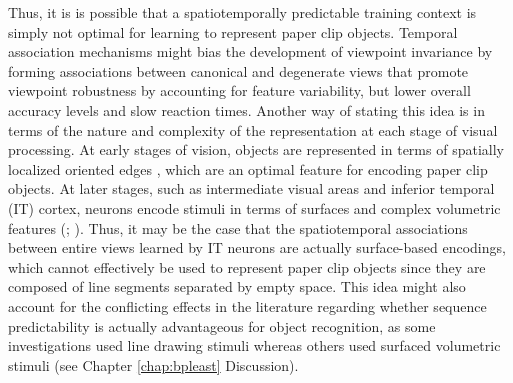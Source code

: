 \documentclass[dwyatte_dissertation.tex]{subfiles}
\begin{document}
Thus, it is is possible that a spatiotemporally predictable training context is simply not optimal for learning to represent paper clip objects. Temporal association mechanisms \cite{StringerPerryRollsEtAl06,WallisBaddeley97,IsikLeiboPoggio12,WallisBulthoff01,WallisBackusLangerEtAl09} might bias the development of viewpoint invariance by forming  associations between canonical and degenerate views that promote viewpoint robustness by accounting for feature variability, but lower overall accuracy levels and slow reaction times. Another way of stating this idea is in terms of the nature and complexity of the representation at each stage of visual processing. At early stages of vision, objects are represented in terms of spatially localized oriented edges \cite{HubelWiesel62}, which are an optimal feature for encoding paper clip objects. At later stages, such as intermediate visual areas and inferior temporal (IT) cortex, neurons encode stimuli in terms of surfaces and complex volumetric features (; ). Thus, it may be the case that the spatiotemporal associations between entire views learned by IT neurons \cite{SakaiMiyashita91,MeyerOlson11,CoxMeierOerteltEtAl05,LiDiCarlo08,LiDiCarlo10,LiDiCarlo12} are actually surface-based encodings, which cannot effectively be used to represent paper clip objects since they are composed of line segments separated by empty space. This idea might also account for the conflicting effects in the literature regarding whether sequence predictability is actually advantageous for object recognition, as some investigations used line drawing stimuli \cite{LawsonHumphreysWatson94} whereas others used surfaced volumetric stimuli \cite{HarmanHumphrey99} (see Chapter \ref{chap:bpleast} Discussion).
\end{document}
